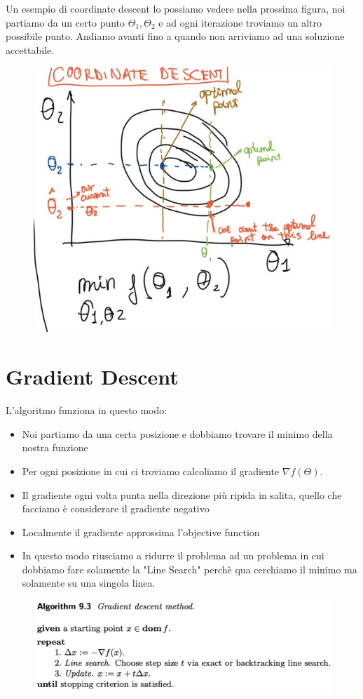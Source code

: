 \documentclass[14pt]{extreport}
\begin{document}
Un esempio di coordinate descent lo possiamo vedere nella prossima figura, noi partiamo da un certo punto $\Theta_1, \Theta_2$ e ad ogni iterazione
troviamo un altro possibile punto. Andiamo avanti fino a quando non arriviamo ad una soluzione accettabile.

\begin{figure}[H]
	\centering
	\includegraphics[width=0.7\linewidth]{237.jpeg}
\end{figure}


\section{Gradient Descent}

L'algoritmo funziona in questo modo:

\begin{itemize}
	\item Noi partiamo da una certa posizione e dobbiamo trovare il minimo della nostra funzione
	\item Per ogni posizione in cui ci troviamo calcoliamo il gradiente $\nabla f(\Theta)$.
	\item Il gradiente ogni volta punta nella direzione più ripida in salita, quello che facciamo è considerare il gradiente negativo
	\item Localmente il gradiente approssima l'objective function
	\item In questo modo riusciamo a ridurre il problema ad un problema in cui dobbiamo fare solamente la "Line Search" perchè qua cerchiamo il minimo
	ma solamente su una singola linea.
\end{itemize}

\begin{figure}[H]
	\centering
	\includegraphics[width=0.7\linewidth]{238.jpeg}
\end{figure}
\end{document}

